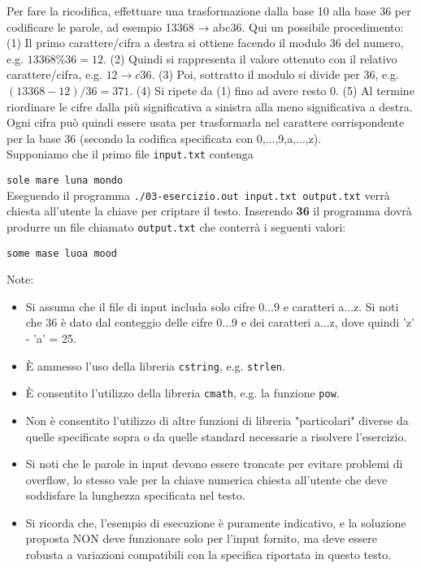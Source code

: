 \documentclass{article}
\begin{document}
    Per fare la ricodifica, effettuare una trasformazione dalla base 10 alla base 36 per codificare le parole, ad esempio 13368 → abc36. Qui un possibile procedimento: (1) Il primo carattere/cifra a destra si ottiene facendo il modulo 36 del numero, e.g. \(13368 \% 36 = 12\). (2) Quindi si rappresenta il valore ottenuto con il relativo carattere/cifra, e.g. \(12 \rightarrow c36\). (3) Poi, sottratto il modulo si divide per 36, e.g. \((13368 - 12)/36 = 371\). (4) Si ripete da (1) fino ad avere resto 0. (5) Al termine riordinare le cifre dalla più significativa a sinistra alla meno significativa a destra. Ogni cifra può quindi essere usata per trasformarla nel carattere corrispondente per la base 36 (secondo la codifica specificata con 0,...,9,a,...,z).\\

    \noindent Supponiamo che il primo file \texttt{input.txt} contenga 
    
    \texttt{sole mare luna mondo}\\
    
    \noindent Eseguendo il programma \texttt{./03-esercizio.out input.txt output.txt} verrà chiesta all'utente la chiave per criptare il testo. Inserendo \textbf{36} il programma dovrà produrre un file chiamato \texttt{output.txt} che conterrà i seguenti valori: 
    
    \texttt{some mase luoa mood}

    Note:
    \begin{itemize}
        \item Si assuma che il file di input includa solo cifre 0...9 e caratteri a...z. Si noti che 36 è dato dal conteggio delle cifre 0...9 e dei caratteri a...z, dove quindi 'z' - 'a' = 25.
        \item È ammesso l'uso della libreria \texttt{cstring}, e.g. \texttt{strlen}.
        \item È consentito l'utilizzo della libreria \texttt{cmath}, e.g. la funzione \texttt{pow}.
        \item Non è consentito l'utilizzo di altre funzioni di libreria "particolari" diverse da quelle specificate sopra o da quelle standard necessarie a risolvere l'esercizio.
        \item Si noti che le parole in input devono essere troncate per evitare problemi di overflow, lo stesso vale per la chiave numerica chiesta all'utente che deve soddisfare la lunghezza specificata nel testo.
        \item Si ricorda che, l'esempio di esecuzione è puramente indicativo, e la soluzione proposta NON deve funzionare solo per l'input fornito, ma deve essere robusta a variazioni compatibili con la specifica riportata in questo testo.
    \end{itemize}
\end{document}
